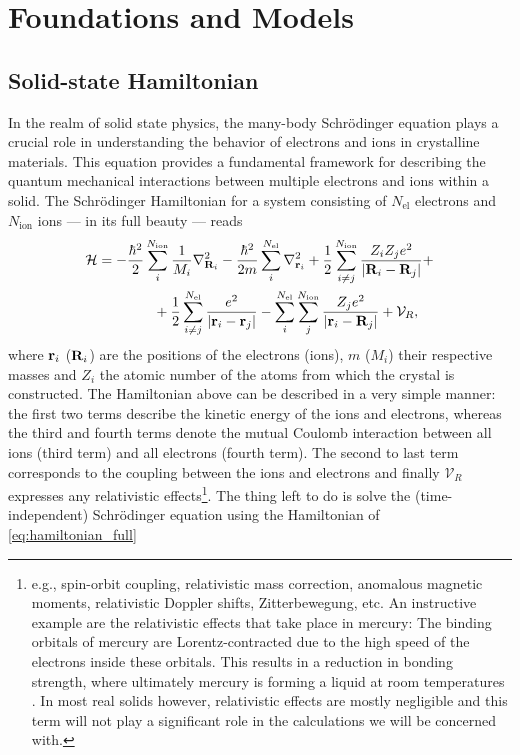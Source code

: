 \documentclass[../../main.tex]{subfiles}
\begin{document}
\chapter{Foundations and Models}\label{ch:foundations_and_models}

\section{Solid-state Hamiltonian}

In the realm of solid state physics, the many-body Schrödinger equation plays a crucial role in understanding the behavior of electrons and ions in crystalline materials. This equation provides a fundamental framework for describing the quantum mechanical interactions between multiple electrons and ions within a solid. The Schrödinger Hamiltonian for a system consisting of $N_{\text{el}}$ electrons and $N_{\text{ion}}$ ions --- in its full beauty --- reads
\begin{align}\label{eq:hamiltonian_full}
\begin{split}
        \mathcal{H}&=-\frac{\hbar^2}{2}\sum_{i}^{N_{\text{ion}}}\frac{1}{M_i}\nabla^2_{\textbf{R}_i}-\frac{\hbar^2}{2m}\sum_{i}^{N_{\text{el}}}\nabla^2_{\textbf{r}_i}+\frac{1}{2}\sum_{i\neq j}^{N_{\text{ion}}}\frac{Z_i Z_j e^2}{|\textbf{R}_i-\textbf{R}_j|}+\\
        &\qquad\qquad+\frac{1}{2}\sum_{i\neq j}^{N_{\text{el}}}\frac{e^2}{|\textbf{r}_i-\textbf{r}_j|}-\sum_i^{N_{\text{el}}}\sum_j^{N_{\text{ion}}}\frac{Z_j e^2}{|\textbf{r}_i-\textbf{R}_j|}+\mathcal{V}_R,  
\end{split}
\end{align}
where $\textbf{r}_i$ ($\textbf{R}_i$) are the positions of the electrons (ions), $m$ ($M_i$) their respective masses and $Z_i$ the atomic number of the atoms from which the crystal is constructed. The Hamiltonian above can be described in a very simple manner: the first two terms describe the kinetic energy of the ions and electrons, whereas the third and fourth terms denote the mutual Coulomb interaction between all ions (third term) and all electrons (fourth term). The second to last term corresponds to the coupling between the ions and electrons and finally $\mathcal{V}_R$ expresses any relativistic effects\footnote{e.g., spin-orbit coupling, relativistic mass correction, anomalous magnetic moments, relativistic Doppler shifts, Zitterbewegung, etc. An instructive example are the relativistic effects that take place in mercury: The binding orbitals of mercury are Lorentz-contracted due to the high speed of the electrons inside these orbitals. This results in a reduction in bonding strength, where ultimately mercury is forming a liquid at room temperatures \cite{Calvo2013}. In most real solids however, relativistic effects are mostly negligible and this term will not play a significant role in the calculations we will be concerned with.}. The  thing left to do is solve the (time-independent) Schrödinger equation using the Hamiltonian of \eqref{eq:hamiltonian_full}
\end{document}
